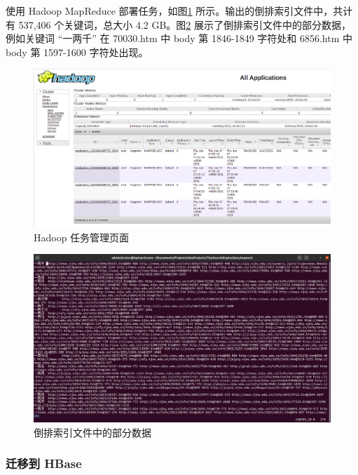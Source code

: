 \documentclass{ctexart}
\begin{document}
    使用 Hadoop MapReduce 部署任务，如图\ref{fig:segment_tasks} 所示。输出的倒排索引文件中，共计有 537,406 个关键词，总大小 4.2 GB。图\ref{fig:segment_rows} 展示了倒排索引文件中的部分数据，例如关键词 “一两千” 在 70030.htm 中 body 第 1846-1849 字符处和 6856.htm 中 body 第 1597-1600 字符处出现。

    \begin{figure}[t]
        \centering
        \includegraphics[width=\textwidth]{src/segment_tasks}
        \caption{Hadoop 任务管理页面}
        \label{fig:segment_tasks}
    \end{figure}

    \begin{figure}[t]
        \centering
        \includegraphics[width=\textwidth]{src/segment_rows}
        \caption{倒排索引文件中的部分数据}
        \label{fig:segment_rows}
    \end{figure}

    \subsubsection{迁移到 HBase}\label{subsubsec:segment_migrate}
\end{document}
